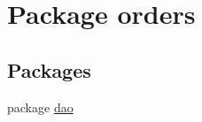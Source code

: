 \hypertarget{namespaceorders}{}\section{Package orders}
\label{namespaceorders}
\subsection*{Packages}
\begin{DoxyCompactItemize}
\item 
package \mbox{\hyperlink{namespaceorders_1_1dao}{dao}}
\end{DoxyCompactItemize}
